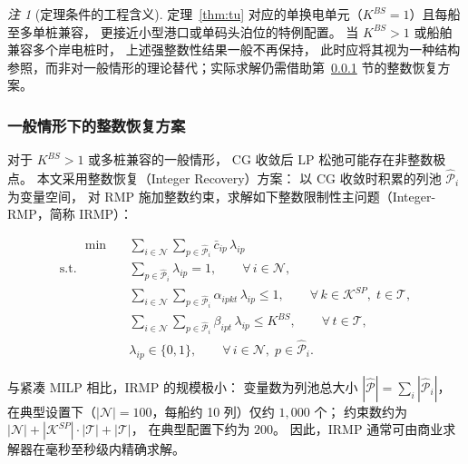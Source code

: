 \documentclass[UTF8, a4paper, 12pt]{ctexart}
\theoremstyle{plain}
\theoremstyle{definition}
\theoremstyle{remark}
\newtheorem{remark}{注}
\begin{document}
\begin{remark}[定理条件的工程含义]
定理~\ref{thm:tu} 对应的单换电单元（$K^{BS}=1$）且每船至多单桩兼容，
更接近小型港口或单码头泊位的特例配置。
当 $K^{BS}>1$ 或船舶兼容多个岸电桩时，
上述强整数性结果一般不再保持，
此时应将其视为一种结构参照，而非对一般情形的理论替代；实际求解仍需借助第~\ref{sec:cg_ir} 节的整数恢复方案。
\end{remark}

\subsubsection{一般情形下的整数恢复方案}
\label{sec:cg_ir}

对于 $K^{BS}>1$ 或多桩兼容的一般情形，
CG 收敛后 LP 松弛可能存在非整数极点。
本文采用整数恢复（Integer Recovery）方案：
以 CG 收敛时积累的列池 $\hat{\mathcal{P}}_i$ 为变量空间，
对 RMP 施加整数约束，求解如下整数限制性主问题（Integer-RMP，简称 IRMP）：

\begin{align}
  [\text{IRMP}] \qquad
  \min \quad & \sum_{i \in \mathcal{N}} \sum_{p \in \hat{\mathcal{P}}_i}
    \bar{c}_{ip}\, \lambda_{ip}
  \label{eq:irmp_obj} \\
  \text{s.t.} \quad
  & \sum_{p \in \hat{\mathcal{P}}_i} \lambda_{ip} = 1,
    \qquad \forall\, i \in \mathcal{N},
  \label{eq:irmp_convex} \\
  & \sum_{i \in \mathcal{N}} \sum_{p \in \hat{\mathcal{P}}_i}
    \alpha_{ipkt}\, \lambda_{ip} \le 1,
    \qquad \forall\, k \in \mathcal{K}^{SP},\; t \in \mathcal{T},
  \label{eq:irmp_sp} \\
  & \sum_{i \in \mathcal{N}} \sum_{p \in \hat{\mathcal{P}}_i}
    \beta_{ipt}\, \lambda_{ip} \le K^{BS},
    \qquad \forall\, t \in \mathcal{T},
  \label{eq:irmp_bs} \\
  & \lambda_{ip} \in \{0,1\},
    \qquad \forall\, i \in \mathcal{N},\; p \in \hat{\mathcal{P}}_i.
  \label{eq:irmp_int}
\end{align}

与紧凑 MILP 相比，IRMP 的规模极小：
变量数为列池总大小 $|\hat{\mathcal{P}}|=\sum_i|\hat{\mathcal{P}}_i|$，
在典型设置下（$|\mathcal{N}|=100$，每船约 10 列）仅约 $1{,}000$ 个；
约束数约为 $|\mathcal{N}|+|\mathcal{K}^{SP}|\cdot|\mathcal{T}|+|\mathcal{T}|$，
在典型配置下约为 $200$。
因此，IRMP 通常可由商业求解器在毫秒至秒级内精确求解。
\end{document}
